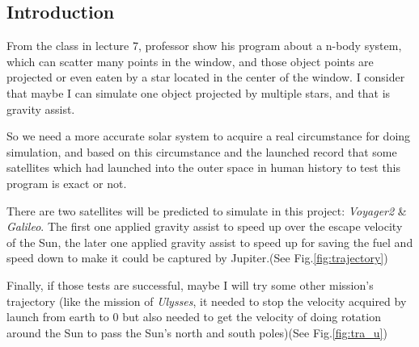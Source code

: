 \documentclass{article}
\begin{document}
\begin{multicols}{2}

\section{Introduction}

From the class in lecture 7, professor show his program about a n-body system, which can scatter many points in the window, and those object points are projected or even eaten by a star located in the center of the window. I consider that maybe I can simulate one object projected by multiple stars, and that is gravity assist.

So we need a more accurate solar system to acquire a real circumstance for doing simulation, and based on this circumstance and the launched record that some satellites which had launched into the outer space in human history to test this program is exact or not.

There are two satellites will be predicted to simulate in this project: \emph{Voyager2}\cite{b1} \& \emph{Galileo}\cite{b2}. The first one applied gravity assist to speed up over the escape velocity of the Sun, the later one applied gravity assist to speed up for saving the fuel and speed down to make it could be captured by Jupiter.(See Fig.\ref{fig:trajectory})

Finally, if those tests are successful, maybe I will try some other mission's trajectory (like the mission of \emph{Ulysses}, it needed to stop the velocity acquired by launch from earth to 0 but also needed to get the velocity of doing rotation around the Sun to pass the Sun's north and south poles)(See Fig.\ref{fig:tra_u})


\end{multicols}
\end{document}
